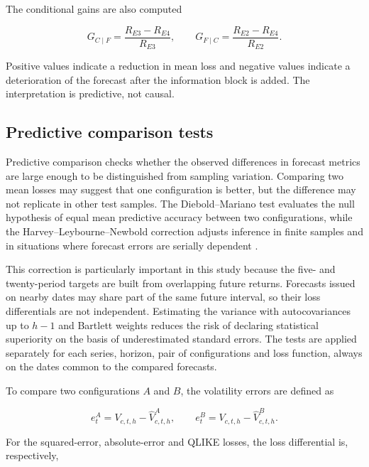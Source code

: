 \documentclass[a4paper,fleqn]{cas-sc}
\begin{document}
The conditional gains are also computed

\begin{equation}
G_{C\mid F}=\frac{R_{E3}-R_{E4}}{R_{E3}},
\qquad
G_{F\mid C}=\frac{R_{E2}-R_{E4}}{R_{E2}}.
\label{eq:conditional_gain}
\end{equation}

Positive values indicate a reduction in mean loss and negative values indicate a deterioration of the forecast after the information block is added. The interpretation is predictive, not causal.

\subsection{Predictive comparison tests}
\label{subsec:dm_test}

Predictive comparison checks whether the observed differences in forecast metrics are large enough to be distinguished from sampling variation. Comparing two mean losses may suggest that one configuration is better, but the difference may not replicate in other test samples. The Diebold--Mariano test evaluates the null hypothesis of equal mean predictive accuracy between two configurations, while the Harvey--Leybourne--Newbold correction adjusts inference in finite samples and in situations where forecast errors are serially dependent \citep{DieboldMariano1995,HarveyLeybourneNewbold1997}.

This correction is particularly important in this study because the five- and twenty-period targets are built from overlapping future returns. Forecasts issued on nearby dates may share part of the same future interval, so their loss differentials are not independent. Estimating the variance with autocovariances up to \(h-1\) and Bartlett weights reduces the risk of declaring statistical superiority on the basis of underestimated standard errors. The tests are applied separately for each series, horizon, pair of configurations and loss function, always on the dates common to the compared forecasts.

To compare two configurations \(A\) and \(B\), the volatility errors are defined as

\begin{equation}
e^{A}_{t}=V_{c,t,h}-\widehat{V}^{A}_{c,t,h},
\qquad
e^{B}_{t}=V_{c,t,h}-\widehat{V}^{B}_{c,t,h}.
\label{eq:forecast_errors}
\end{equation}

For the squared-error, absolute-error and QLIKE losses, the loss differential is, respectively,
\end{document}

